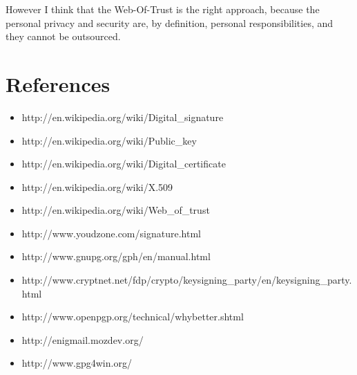 \documentclass[a4paper]{article}
\begin{document}
However I think that the Web-Of-Trust is the right approach, because
the personal privacy and security are, by definition, personal
responsibilities, and they cannot be outsourced.


\section{References}

\begin{itemize}
  \item http://en.wikipedia.org/wiki/Digital\_signature
  \item http://en.wikipedia.org/wiki/Public\_key
  \item http://en.wikipedia.org/wiki/Digital\_certificate
  \item http://en.wikipedia.org/wiki/X.509
  \item http://en.wikipedia.org/wiki/Web\_of\_trust
  \item http://www.youdzone.com/signature.html
  \item http://www.gnupg.org/gph/en/manual.html
  \item http://www.cryptnet.net/fdp/crypto/keysigning\_party/en/keysigning\_party.html
  \item http://www.openpgp.org/technical/whybetter.shtml
  \item http://enigmail.mozdev.org/
  \item http://www.gpg4win.org/
\end{itemize}
\end{document}
